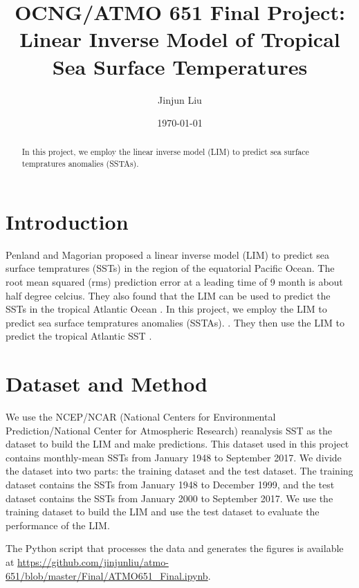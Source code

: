 \documentclass[12pt,a4paper]{article}
\title{OCNG/ATMO 651 Final Project: Linear Inverse Model of Tropical Sea Surface Temperatures}
\author{Jinjun Liu}
\date{\today}
\begin{document}
\maketitle
\thispagestyle{empty}
\begin{abstract}

In this project, we employ the linear inverse model (LIM) to predict sea surface tempratures anomalies (SSTAs).

\end{abstract}

\tableofcontents

\clearpage %

\section{Introduction} %

Penland and Magorian \cite{Penland1993} proposed a linear inverse model (LIM) to predict sea surface tempratures (SSTs) in the region of the equatorial Pacific Ocean. The root mean squared (rms) prediction error at a leading time of 9 month is about half degree celcius. They also found that the LIM can be used to predict the SSTs in the tropical Atlantic Ocean \cite{Penland1996}. In this project, we employ the LIM to predict sea surface tempratures anomalies (SSTAs).
 \cite{Penland1993}. They then use the LIM to predict the tropical Atlantic SST \cite{Penland1996}.

\section{Dataset and Method}\label{dataset-method}

We use the NCEP/NCAR (National Centers for Environmental Prediction/National Center for Atmospheric Research) reanalysis SST as the dataset to build the LIM and make predictions. This dataset used in this project contains monthly-mean SSTs from January 1948 to September 2017. We divide the dataset into two parts: the training dataset and the test dataset. The training dataset contains the SSTs from January 1948 to December 1999, and the test dataset contains the SSTs from January 2000 to September 2017. We use the training dataset to build the LIM and use the test dataset to evaluate the performance of the LIM.

The Python script that processes the data and generates the figures is available at \url{https://github.com/jinjunliu/atmo-651/blob/master/Final/ATMO651\_Final.ipynb}.
\end{document}
